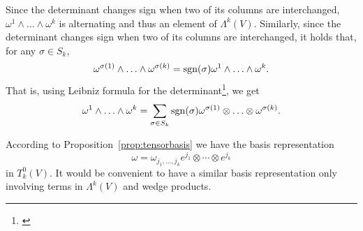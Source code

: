 Since the determinant changes sign when two of its columns are interchanged, $\omega^1\wedge\ldots\wedge\omega^k$ is alternating and thus an element of $\Lambda^k(V)$.
Similarly, since the determinant changes sign when two of its columns are interchanged, it holds that, for any $\sigma\in S_k$,
\begin{equation}\label{equiv:permut}
	\omega^{\sigma(1)}\wedge\ldots\wedge\omega^{\sigma(k)} = \operatorname{sgn}(\sigma) \omega^1\wedge\ldots\wedge\omega^k.
\end{equation}
That is, using Leibniz formula for the determinant\footnote{\cite[Equation (B.3)]{book:lee}}, we get
\begin{equation}\label{eq:detLeibniz}
	\omega^1\wedge\ldots\wedge\omega^k = \sum_{\sigma\in S_k}\operatorname{sgn}(\sigma) \omega^{\sigma(1)}\otimes\ldots\otimes\omega^{\sigma(k)}.
\end{equation}

According to Proposition~\ref{prop:tensorbasis} we have the basis representation
\begin{equation}
	\omega = \omega_{j_1, \ldots, j_k} e^{j_1}\otimes \cdots \otimes e^{j_k}
\end{equation}
in $T_k^0(V)$.
It would be convenient to have a similar basis representation only involving terms in $\Lambda^k(V)$ and wedge products.

